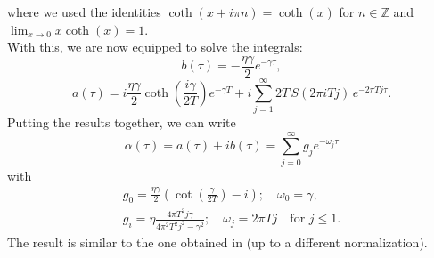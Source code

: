 where we used the identities $\coth(x+i\pi n) = \coth(x)$ for $n\in\mathbb{Z}$ and $\lim_{x\rightarrow
0}x\coth(x)=1$.
\\
With this, we are now equipped to solve the integrals:
\begin{equation*}
    b(\tau) = -\frac{\eta\gamma}{2} e^{-\gamma\tau},
\end{equation*}
\begin{equation*}
    a(\tau) = i\frac{\eta\gamma}{2}\coth\left(
        \frac{i\gamma}{2T}
    \right)e^{-\gamma T} + i\sum_{j=1}^{\infty}2T\,S(2\pi iTj)\,e^{-2\pi Tj\tau}.
\end{equation*}
Putting the results together, we can write
\begin{equation*}
    \alpha(\tau) = a(\tau) + ib(\tau) = \sum_{j=0}^{\infty} g_j e^{-\omega_j\tau}
\end{equation*}
with
\begin{equation}
    \begin{split}
        \label{eq:expansion_coefficients_debye_BCF_SBM}
        g_0 = \frac{\eta\gamma}{2}\left(
            \cot\left(\frac{\gamma}{2T}\right) - i
        \right);\quad
        \omega_0 = \gamma,\\
        g_i = \eta \frac{4\pi T^2j\gamma}{4\pi^2T^2j^2-\gamma^2};\quad
        \omega_j = 2\pi Tj \quad \text{for }j\le1.
    \end{split}
\end{equation}
The result is similar to the one obtained in \cite{Qiang:2009} (up to a different normalization).